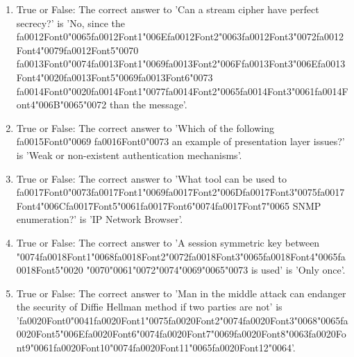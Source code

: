 \documentclass[12pt]{article}
\begin{document}
\begin{enumerate}[label=\arabic*.]
\item True or False: The correct answer to 'Can a stream cipher have perfect secrecy?' is 'No, since the {\csname fa0012Font0\endcsname\char"0065}{\csname fa0012Font1\endcsname\char"006E}{\csname fa0012Font2\endcsname\char"0063}{\csname fa0012Font3\endcsname\char"0072}{\csname fa0012Font4\endcsname\char"0079}{\csname fa0012Font5\endcsname\char"0070} {\csname fa0013Font0\endcsname\char"0074}{\csname fa0013Font1\endcsname\char"0069}{\csname fa0013Font2\endcsname\char"006F}{\csname fa0013Font3\endcsname\char"006E}{\csname fa0013Font4\endcsname\char"0020}{\csname fa0013Font5\endcsname\char"0069}{\csname fa0013Font6\endcsname\char"0073} {\csname fa0014Font0\endcsname\char"0020}{\csname fa0014Font1\endcsname\char"0077}{\csname fa0014Font2\endcsname\char"0065}{\csname fa0014Font3\endcsname\char"0061}{\csname fa0014Font4\endcsname\char"006B}{\char"0065}{\char"0072} than the message'.
\item True or False: The correct answer to 'Which of the following {\csname fa0015Font0\endcsname\char"0069} {\csname fa0016Font0\endcsname\char"0073} an example of presentation layer issues?' is 'Weak or non-existent authentication mechanisms'.
\item True or False: The correct answer to 'What tool can be used to {\csname fa0017Font0\endcsname\char"0073}{\csname fa0017Font1\endcsname\char"0069}{\csname fa0017Font2\endcsname\char"006D}{\csname fa0017Font3\endcsname\char"0075}{\csname fa0017Font4\endcsname\char"006C}{\csname fa0017Font5\endcsname\char"0061}{\csname fa0017Font6\endcsname\char"0074}{\csname fa0017Font7\endcsname\char"0065} SNMP enumeration?' is 'IP Network Browser'.
\item True or False: The correct answer to 'A session symmetric key between {\char"0074}{\csname fa0018Font1\endcsname\char"0068}{\csname fa0018Font2\endcsname\char"0072}{\csname fa0018Font3\endcsname\char"0065}{\csname fa0018Font4\endcsname\char"0065}{\csname fa0018Font5\endcsname\char"0020} {\char"0070}{\char"0061}{\char"0072}{\char"0074}{\char"0069}{\char"0065}{\char"0073} is used' is 'Only once'.
\item True or False: The correct answer to 'Man in the middle attack can endanger the security of Diffie Hellman method if two parties are not' is '{\csname fa0020Font0\endcsname\char"0041}{\csname fa0020Font1\endcsname\char"0075}{\csname fa0020Font2\endcsname\char"0074}{\csname fa0020Font3\endcsname\char"0068}{\char"0065}{\csname fa0020Font5\endcsname\char"006E}{\csname fa0020Font6\endcsname\char"0074}{\csname fa0020Font7\endcsname\char"0069}{\csname fa0020Font8\endcsname\char"0063}{\csname fa0020Font9\endcsname\char"0061}{\csname fa0020Font10\endcsname\char"0074}{\csname fa0020Font11\endcsname\char"0065}{\csname fa0020Font12\endcsname\char"0064}'.

\end{enumerate}
\end{document}
